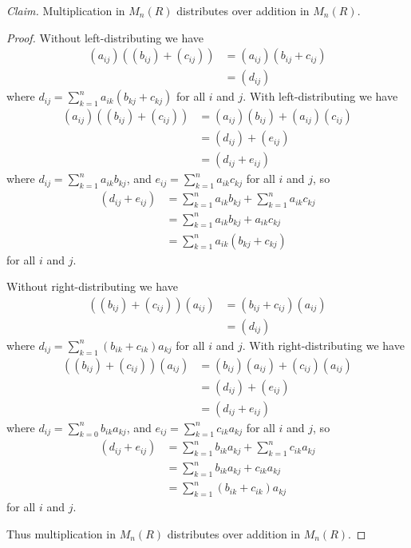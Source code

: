 \documentclass{abrice}
\begin{document}
\noindent
\emph{Claim.} Multiplication in $M_n(R)$ distributes over addition in $M_n(R)$.

\begin{proof}
  Without left-distributing we have
  \begin{align*}
    (a_{ij})((b_{ij}) + (c_{ij}))
    &= (a_{ij})(b_{ij} + c_{ij}) \\
    &= (d_{ij})
  \end{align*}
  where $d_{ij} = \sum_{k=1}^{n} a_{ik}(b_{kj} + c_{kj})$ for all $i$ and $j$.
  With left-distributing we have
  \begin{align*}
    (a_{ij})((b_{ij}) + (c_{ij}))
    &= (a_{ij})(b_{ij}) + (a_{ij})(c_{ij}) \\
    &= (d_{ij}) + (e_{ij}) \\
    &= (d_{ij} + e_{ij})
  \end{align*}
  where $d_{ij} = \sum_{k=1}^n a_{ik} b_{kj}$, and $e_{ij} = \sum_{k=1}^n a_{ik}
  c_{kj}$ for all $i$ and $j$, so
  \begin{align*}
    (d_{ij} + e_{ij})
    &= \sum_{k=1}^n a_{ik} b_{kj} + \sum_{k=1}^n a_{ik} c_{kj} \\
    &= \sum_{k=1}^n a_{ik} b_{kj} + a_{ik} c_{kj} \\
    &= \sum_{k=1}^n a_{ik} (b_{kj} + c_{kj})
  \end{align*}
  for all $i$ and $j$.

  Without right-distributing we have
  \begin{align*}
    ((b_{ij}) + (c_{ij}))(a_{ij})
    &= (b_{ij} + c_{ij})(a_{ij}) \\
    &= (d_{ij})
  \end{align*}
  where $d_{ij} = \sum_{k=1}^n (b_{ik} + c_{ik}) a_{kj}$ for all $i$ and $j$.
  With right-distributing we have
  \begin{align*}
    ((b_{ij}) + (c_{ij}))(a_{ij})
    &= (b_{ij})(a_{ij}) + (c_{ij})(a_{ij}) \\
    &= (d_{ij}) + (e_{ij}) \\
    &= (d_{ij} + e_{ij})
  \end{align*}
  where $d_{ij} = \sum_{k=0}^n b_{ik} a_{kj}$, and $e_{ij} = \sum_{k=1}^n c_{ik}
  a_{kj}$ for all $i$ and $j$, so
  \begin{align*}
    (d_{ij} + e_{ij})
    &= \sum_{k=1}^n b_{ik} a_{kj} + \sum_{k=1}^n c_{ik} a_{kj} \\
    &= \sum_{k=1}^n b_{ik} a_{kj} + c_{ik} a_{kj} \\
    &= \sum_{k=1}^n (b_{ik} + c_{ik}) a_{kj}
  \end{align*}
  for all $i$ and $j$.

  Thus multiplication in $M_n(R)$ distributes over addition in $M_n(R)$.
\end{proof}
\end{document}
